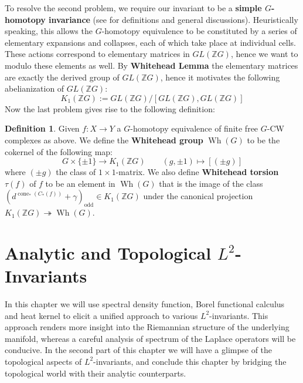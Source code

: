\documentclass[11pt]{report}
\theoremstyle{definition}
\newtheorem{Def}{Definition}[chapter]
\theoremstyle{plain}
\DeclareMathOperator{\cone}{cone}
\DeclareMathOperator{\Wh}{Wh}
\newcommand{\integer}{\mathbb{Z}}
\newcommand{\odd}{\mathrm{odd}}
\begin{document}
\par To resolve the second problem, we require our invariant to be a \textbf{simple $G$-homotopy invariance} (see \cite[Chapter~I.4]{luck2006} for definitions and general discussions). Heuristically speaking, this allows the $G$-homotopy equivalence to be constituted by a series of elementary expansions and collapses, each of which take place at individual cells. These actions correspond to elementary matrices in $GL(\integer G)$, hence we want to modulo these elements as well. By \textbf{Whitehead Lemma} \cite[Lemma~3.1]{milnor2016} the elementary matrices are exactly the derived group of $GL(\integer G)$, hence it motivates the following abelianization of $GL(\integer G)$:
\begin{equation}
K_1(\integer G):=GL(\integer G)/[GL(\integer G), GL(\integer G)]
\end{equation}
Now the last problem gives rise to the following definition:
\begin{Def}\label{3.1.2}
	Given $f:X\to Y$ a $G$-homotopy equivalence of finite free $G$-CW complexes as above. We define the \textbf{Whitehead group} $\Wh(G)$ to be the cokernel of the following map:
	\begin{equation}
	G\times \{\pm 1\}\to K_1(\integer G) \qquad (g, \pm 1)\mapsto [(\pm g)]
	\end{equation}
	where $(\pm g)$ the class of $1\times 1$-matrix. We also define \textbf{Whitehead torsion} $\tau(f)$ of $f$ to be an element in $\Wh(G)$ that is the image of the class $(d^{\cone_*(C_*(f))}+\gamma)_{\odd}\in K_1(\integer G)$ under the canonical projection $K_1(\integer G)\twoheadrightarrow \Wh(G)$.
\end{Def}




\chapter{Analytic and Topological $L^2$-Invariants}\label{chapter2}
In this chapter we will use spectral density function, Borel functional calculus and heat kernel to elicit a unified approach to various $L^2$-invariants. This approach renders more insight into the Riemannian structure of the underlying manifold, whereas a careful analysis of spectrum of the Laplace operators will be conducive. In the second part of this chapter we will have a glimpse of the topological aspects of $L^2$-invariants, and conclude this chapter by bridging the topological world with their analytic counterparts.
\end{document}
